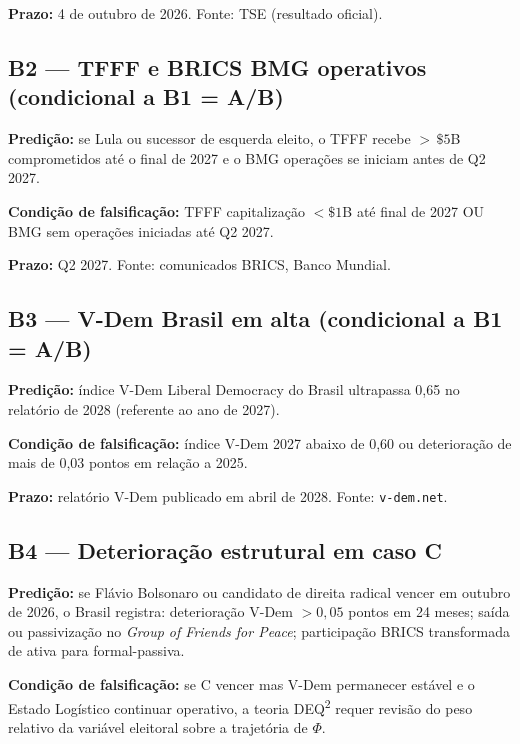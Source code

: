 \documentclass[12pt]{article}
\theoremstyle{definition}
\theoremstyle{remark}
\begin{document}
\textbf{Prazo:} 4 de outubro de 2026. Fonte: TSE (resultado oficial).

\subsection{B2 --- TFFF e BRICS BMG operativos (condicional a B1 = A/B)}

\textbf{Predi\c{c}\~{a}o:} se Lula ou sucessor de esquerda eleito, o TFFF recebe \(>\,\$5\)B comprometidos at\'{e} o final de 2027 e o BMG opera\c{c}\~{o}es se iniciam antes de Q2 2027.

\textbf{Condi\c{c}\~{a}o de falsifica\c{c}\~{a}o:} TFFF capitaliza\c{c}\~{a}o \(< \$1\)B at\'{e} final de 2027 OU BMG sem opera\c{c}\~{o}es iniciadas at\'{e} Q2 2027.

\textbf{Prazo:} Q2 2027. Fonte: comunicados BRICS, Banco Mundial.

\subsection{B3 --- V-Dem Bra\-sil em alta (condicional a B1 = A/B)}

\textbf{Predi\c{c}\~{a}o:} \'{i}ndice V-Dem Liberal Democracy do Brasil ultrapassa 0,65 no relat\'{o}rio de 2028 (referente ao ano de 2027).

\textbf{Condi\c{c}\~{a}o de falsifica\c{c}\~{a}o:} \'{i}ndice V-Dem 2027 abaixo de 0,60 ou deteriora\c{c}\~{a}o de mais de 0,03 pontos em rela\c{c}\~{a}o a 2025.

\textbf{Prazo:} relat\'{o}rio V-Dem publicado em abril de 2028. Fonte: \texttt{v-dem.net}.

\subsection{B4 --- Deteriora\c{c}\~{a}o estrutural em caso C}

\textbf{Predi\c{c}\~{a}o:} se Fl\'{a}vio Bolsonaro ou candidato de direita radical vencer em outubro de 2026, o Brasil registra: deteriora\c{c}\~{a}o V-Dem \(> 0,05\) pontos em 24 meses; sa\'{i}da ou passiviza\c{c}\~{a}o no \textit{Group of Friends for Peace}; participa\c{c}\~{a}o BRICS transformada de ativa para formal-passiva.

\textbf{Condi\c{c}\~{a}o de falsifica\c{c}\~{a}o:} se C vencer mas V-Dem permanecer est\'{a}vel e o Estado Log\'{i}stico continuar operativo, a teoria DEQ\textsuperscript{2} requer revis\~{a}o do peso relativo da vari\'{a}vel eleitoral sobre a trajet\'{o}ria de \(\Phi\).
\end{document}

